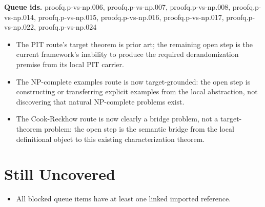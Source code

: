 \documentclass[11pt]{article}
\begin{document}
\textbf{Queue ids.} proofq.p-vs-np.006, proofq.p-vs-np.007, proofq.p-vs-np.008, proofq.p-vs-np.014, proofq.p-vs-np.015, proofq.p-vs-np.016, proofq.p-vs-np.017, proofq.p-vs-np.022, proofq.p-vs-np.024

\begin{itemize}[leftmargin=*,itemsep=0.2em]
\item The PIT route's target theorem is prior art; the remaining open step is the current framework's inability to produce the required derandomization premise from its local PIT carrier.
\item The NP-complete examples route is now target-grounded: the open step is constructing or transferring explicit examples from the local abstraction, not discovering that natural NP-complete problems exist.
\item The Cook-Reckhow route is now clearly a bridge problem, not a target-theorem problem: the open step is the semantic bridge from the local definitional object to this existing characterization theorem.
\end{itemize}

\section{Still Uncovered}
\begin{itemize}[leftmargin=*,itemsep=0.2em]
\item All blocked queue items have at least one linked imported reference.
\end{itemize}
\end{document}
